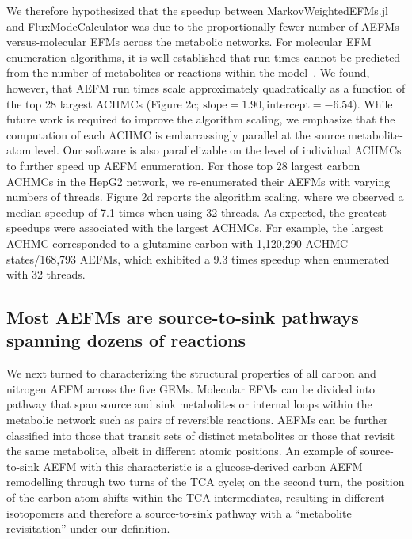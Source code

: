 \documentclass[12pt]{article}
\begin{document}
We therefore hypothesized that the speedup between MarkovWeightedEFMs.jl
and FluxModeCalculator was due to the proportionally fewer number of
AEFMs-versus-molecular EFMs across the metabolic networks. For molecular
EFM enumeration algorithms, it is well established that run times cannot
be predicted from the number of metabolites or reactions within the
model~\citep{UllahEhsan2020Tsef}. We found, however, that AEFM run times
scale approximately quadratically as a function of the top 28 largest
ACHMCs (Figure 2c; $\text{slope}=1.90, \text{intercept}=-6.54$). While
future work is required to improve the algorithm scaling, we emphasize
that the computation of each ACHMC is embarrassingly parallel at the
source metabolite-atom level. Our software is also parallelizable on the
level of individual ACHMCs to further speed up AEFM enumeration. For those
top 28 largest carbon ACHMCs in the HepG2 network, we re-enumerated their
AEFMs with varying numbers of threads. Figure 2d reports the algorithm
scaling, where we observed a median speedup of 7.1 times when using 32
threads. As expected, the greatest speedups were associated with the
largest ACHMCs. For example, the largest ACHMC corresponded to a glutamine
carbon with 1,120,290 ACHMC states/168,793 AEFMs, which exhibited a 9.3
times speedup when enumerated with 32 threads.

\fi

\subsection*{Most AEFMs are source-to-sink pathways spanning dozens of reactions}

We next turned to characterizing the structural properties of all carbon
and nitrogen AEFM across the five GEMs. Molecular EFMs can be divided into
pathway that span source and sink metabolites or internal loops within the
metabolic network such as pairs of reversible reactions. AEFMs can be
further classified into those that transit sets of distinct metabolites or
those that revisit the same metabolite, albeit in different atomic
positions. An example of source-to-sink AEFM with this characteristic is
a glucose-derived carbon AEFM remodelling through two turns of the TCA
cycle; on the second turn, the position of the carbon atom shifts within
the TCA intermediates, resulting in different isotopomers and therefore
a source-to-sink pathway with a ``metabolite revisitation'' under our
definition.
\end{document}
